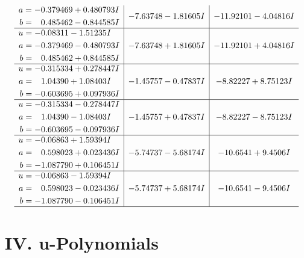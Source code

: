 \documentclass[1p]{elsarticle_modified}
\theoremstyle{definition}
\begin{document}
$$\begin{array}{c|c|c}
\begin{aligned}
a &= -0.379469 + 0.480793 I \\
b &= \phantom{-}0.485462 - 0.844585 I\end{aligned}
 & -7.63748 - 1.81605 I & -11.92101 - 4.04816 I \\ \hline\begin{aligned}
u &= -0.08311 - 1.51235 I \\
a &= -0.379469 - 0.480793 I \\
b &= \phantom{-}0.485462 + 0.844585 I\end{aligned}
 & -7.63748 + 1.81605 I & -11.92101 + 4.04816 I \\ \hline\begin{aligned}
u &= -0.315334 + 0.278447 I \\
a &= \phantom{-}1.04390 + 1.08403 I \\
b &= -0.603695 + 0.097936 I\end{aligned}
 & -1.45757 - 0.47837 I & -8.82227 + 8.75123 I \\ \hline\begin{aligned}
u &= -0.315334 - 0.278447 I \\
a &= \phantom{-}1.04390 - 1.08403 I \\
b &= -0.603695 - 0.097936 I\end{aligned}
 & -1.45757 + 0.47837 I & -8.82227 - 8.75123 I \\ \hline\begin{aligned}
u &= -0.06863 + 1.59394 I \\
a &= \phantom{-}0.598023 + 0.023436 I \\
b &= -1.087790 + 0.106451 I\end{aligned}
 & -5.74737 - 5.68174 I & -10.6541 + 9.4506 I \\ \hline\begin{aligned}
u &= -0.06863 - 1.59394 I \\
a &= \phantom{-}0.598023 - 0.023436 I \\
b &= -1.087790 - 0.106451 I\end{aligned}
 & -5.74737 + 5.68174 I & -10.6541 - 9.4506 I\\
 \hline 
 \end{array}$$\newpage
\newpage\renewcommand{\arraystretch}{1}
\centering \section*{ IV. u-Polynomials}
\end{document}
